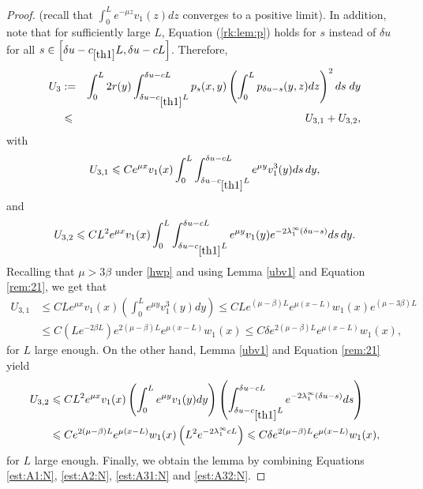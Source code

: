 \documentclass[11pt]{article}
\theoremstyle{plain}
\newcommand\linf{\lambda_1^\infty}
\begin{document}
\begin{proof}
(recall that  $\int_0^L e^{-\mu z}v_1(z)dz$ converges to a positive limit).
In addition, note that for sufficiently large $L$, Equation (\ref{rk:lem:p}) holds for $s$ instead of $\delta u$ for all $s\in\left[\delta u -c_{\ref{th1}}L, \delta u-cL\right]$. Therefore,
\begin{eqnarray*}
U_3&:=&\int_0^L2r(y)\int_{\delta u-c_{\ref{th1}}L}^{\delta u-c L}p_s(x,y)\left(\int_0^Lp_{\delta u -s}(y,z)dz\right)^2 ds\;dy\\
&\leqslant &  U_{3,1}+ U_{3,2},
\end{eqnarray*}
with 
\begin{equation*}
U_{3,1}\leqslant Ce^{\mu x}v_1(x) \int_0^L\int_{\delta u-c_{\ref{th1}}L}^{\delta u-c L} e^{\mu y}v_1^3 (y) ds \,dy,
\end{equation*}
and 
\begin{equation*}
U_{3,2}\leqslant C L^2 e^{\mu x}v_1(x) \int_0^L\int_{\delta u-c_{\ref{th1}}L}^{\delta u-c L} e^{\mu y}v_1(y)e^{-2\linf (\delta u-s)}ds \,dy.
\end{equation*}
Recalling that $\mu>3\beta$ under \eqref{hwp} and using Lemma \ref{ubv1} and Equation \eqref{rem:21}, we get that 
\begin{align}
U_{3,1}&\leqslant CLe^{\mu x}v_1(x) \left(\int_0^L e^{\mu y}v_1^3 (y)  dy \right)\leqslant   CL e^{(\mu-\beta)L}e^{\mu(x-L)}w_1(x) e^{(\mu-3\beta)L}\nonumber\\
&\leqslant  C \left(Le^{-2\beta L}\right) e^{2(\mu-\beta)L}e^{\mu(x-L)}w_1(x)\leqslant  C \delta e^{2(\mu-\beta)L}e^{\mu(x-L)}w_1(x) \label{est:A31:N},
\end{align}
for $L$ large enough.
On the other hand,  Lemma \ref{ubv1} and Equation \eqref{rem:21} yield
\begin{align}
U_{3,2}&\leqslant CL^2 e^{\mu x}v_1(x)\left(\int_0^L e^{\mu y} v_1(y)dy\right)\left(\int_{\delta u-c_{\ref{th1}}L}^{\delta u-c L} e^{-2\linf (\delta u-s)}ds \right)\nonumber\\
&\leqslant  C e^{2(\mu-\beta)L}e^{\mu(x-L)}w_1(x) \left(L^2e^{-2\linf c L}\right)\leqslant C\delta e^{2(\mu-\beta)L}e^{\mu(x-L)}w_1(x),\label{est:A32:N}
\end{align}
for $L$ large enough.
Finally, we obtain the lemma by combining Equations \eqref{est:A1:N}, \eqref{est:A2:N},   \eqref{est:A31:N} and \eqref{est:A32:N}.
\end{proof}
\end{document}
